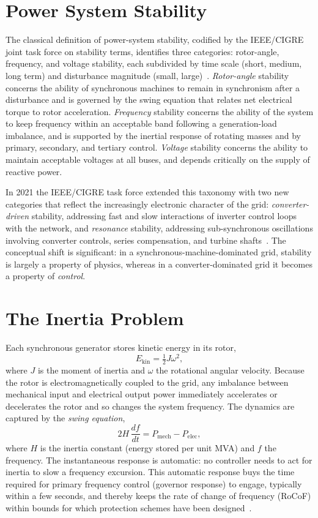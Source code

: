 \documentclass[conference]{IEEEtran}
\begin{document}
\section{Power System Stability}\label{sec:stability}
The classical definition of power-system stability, codified by the IEEE/CIGRE joint task force on stability terms, identifies three categories: rotor-angle, frequency, and voltage stability, each subdivided by time scale (short, medium, long term) and disturbance magnitude (small, large)~\cite{kundur1994,kundur2004definition}. \emph{Rotor-angle} stability concerns the ability of synchronous machines to remain in synchronism after a disturbance and is governed by the swing equation that relates net electrical torque to rotor acceleration. \emph{Frequency} stability concerns the ability of the system to keep frequency within an acceptable band following a generation-load imbalance, and is supported by the inertial response of rotating masses and by primary, secondary, and tertiary control. \emph{Voltage} stability concerns the ability to maintain acceptable voltages at all buses, and depends critically on the supply of reactive power.

In 2021 the IEEE/CIGRE task force extended this taxonomy with two new categories that reflect the increasingly electronic character of the grid: \emph{converter-driven} stability, addressing fast and slow interactions of inverter control loops with the network, and \emph{resonance} stability, addressing sub-synchronous oscillations involving converter controls, series compensation, and turbine shafts~\cite{hatziargyriou2021revisited}. The conceptual shift is significant: in a synchronous-machine-dominated grid, stability is largely a property of physics, whereas in a converter-dominated grid it becomes a property of \emph{control}.

\section{The Inertia Problem}\label{sec:inertia}
Each synchronous generator stores kinetic energy in its rotor,
\begin{equation}
E_{\mathrm{kin}} = \tfrac{1}{2} J \omega^{2},
\end{equation}
where $J$ is the moment of inertia and $\omega$ the rotational angular velocity. Because the rotor is electromagnetically coupled to the grid, any imbalance between mechanical input and electrical output power immediately accelerates or decelerates the rotor and so changes the system frequency. The dynamics are captured by the \emph{swing equation},
\begin{equation}
2H\,\frac{df}{dt} = P_{\mathrm{mech}} - P_{\mathrm{elec}},
\end{equation}
where $H$ is the inertia constant (energy stored per unit MVA) and $f$ the frequency. The instantaneous response is automatic: no controller needs to act for inertia to slow a frequency excursion. This automatic response buys the time required for primary frequency control (governor response) to engage, typically within a few seconds, and thereby keeps the rate of change of frequency (RoCoF) within bounds for which protection schemes have been designed~\cite{kundur1994}.
\end{document}
